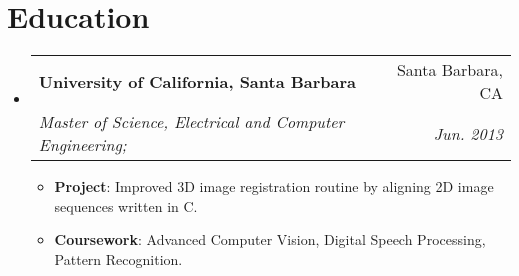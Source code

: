 \documentclass[letterpaper,12pt]{article}
\makeatletter
\newcommand{\resumeItem}[2]{
  \item\small{
    \textbf{#1}{: #2 \vspace{-2pt}}
  }
}
\newcommand{\resumeSubheading}[4]{
  \vspace{-1pt}\item
    \begin{tabular*}{0.97\textwidth}{l@{\extracolsep{\fill}}r}
      \textbf{#1} & #2 \\
      \textit{\small#3} & \textit{\small #4} \\
    \end{tabular*}\vspace{-5pt}
}
\newcommand{\resumeSubHeadingListStart}{\begin{itemize}[leftmargin=*]}
\newcommand{\resumeSubHeadingListEnd}{\end{itemize}}
\newcommand{\resumeItemListStart}{\begin{itemize}}
\newcommand{\resumeItemListEnd}{\end{itemize}\vspace{-5pt}}
\makeatother
\begin{document}
\section{Education}
  \resumeSubHeadingListStart
    \resumeSubheading
      {University of California, Santa Barbara}{Santa Barbara, CA}
      {Master of Science, Electrical and Computer Engineering;}{Jun. 2013}
    \resumeItemListStart
        \resumeItem{Project}
          {Improved 3D image registration routine by aligning 2D image sequences written in C.}
        \resumeItem{Coursework}
          {Advanced Computer Vision, Digital Speech Processing, Pattern Recognition.}
     \resumeItemListEnd
  \resumeSubHeadingListEnd


\end{document}
